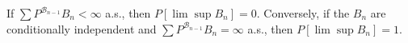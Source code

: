 If $\sum P^{\mathcal{B}_{n-1}} B_n < \infty$ a.s., then $P[\lim \sup B_n] = 0$. Conversely, if the $B_n$ are conditionally independent and $\sum P^{\mathcal{B}_{n-1}} B_n = \infty$ a.s., then $P[\lim \sup B_n] = 1$.

